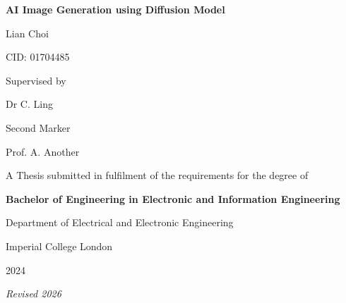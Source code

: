 \documentclass[11pt,a4paper,oneside]{report}
\begin{document}
\singlespacing

\begin{titlepage}
\centering
\vspace*{2.5cm}

{\LARGE\bfseries AI Image Generation using Diffusion Model\par}

\vspace{2.5cm}
{\large Lian Choi\par}
\vspace{0.3cm}
{\normalsize CID: 01704485\par}

\vspace{2cm}
{\normalsize Supervised by\par}
\vspace{0.3cm}
{\large Dr C. Ling\par}

\vspace{1.5cm}
{\normalsize Second Marker\par}
\vspace{0.3cm}
{\large Prof. A. Another\par}

\vspace{2.5cm}
{\normalsize A Thesis submitted in fulfilment of the requirements for the degree of\par}
\vspace{0.3cm}
{\normalsize\bfseries Bachelor of Engineering in Electronic and Information Engineering\par}

\vspace{2cm}
{\normalsize Department of Electrical and Electronic Engineering\par}
{\normalsize Imperial College London\par}
\vspace{0.5cm}
{\normalsize 2024\par}
\vspace{0.4cm}
{\small\itshape Revised 2026\par}

\vfill
\end{titlepage}

\pagestyle{plain}
\end{document}
